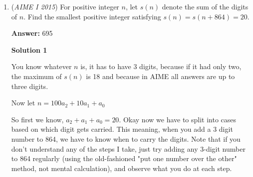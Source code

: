 \begin{enumerate}
 Since $AE$ = $AM + ME$, we get

 
 \[2 \cdot \frac{3\sqrt{11}}{\sqrt5} + \sqrt{5} \cdot \frac{\frac{4a\sqrt5}{7} - \frac{9\sqrt{11}}{2}}{2} = a\]

 \[\Rightarrow 12\sqrt{11} + 5(\frac{4a\sqrt5}{7} - \frac{9\sqrt{11}}{2}) = 2\sqrt5a\]

 \[\Rightarrow \frac{-21}{2}\sqrt{11} + \frac{20a\sqrt5}{7} = 2\sqrt5a\]

 \[\Rightarrow -21\sqrt{11} = 2\sqrt5a\frac{14 - 20}{7}\]

 \[\Rightarrow \frac{49\sqrt{11}}{4} = \sqrt5a\]

 \[\Rightarrow 7\sqrt{11} = \frac{4a\sqrt{5}}{7}\]

 So our final answer is $(7\sqrt{11})^2 = \boxed{539}$.

 



\textbf{Solution 3}

This is the quickest solution. We see that with a ruler, $KL = \frac{3}{2}$ cm and $HG = \frac{7}{2}$ cm. Thus if $KL$ corresponds with an area of $99$, then $HG$ ($FGHJ$'s area) would correspond with $99*(\frac{7}{3})^2 = \boxed{539}$ - aops5234

 


	\item (\textit{AIME I 2015}) For positive integer $n$, let $s(n)$ denote the sum of the digits of $n$.  Find the smallest positive integer satisfying $s(n) = s(n+864) = 20$.


 



 
 \textbf{Answer: }695



\textbf{Solution 1}

You know whatever $n$ is, it has to have 3 digits, because if it had only two, the maximum of $s(n)$ is 18 and because in AIME all answers are up to three digits. 

 Now let $n=100a_2+10a_1+a_0$

 So first we know, $a_2+a_1+a_0=20$. Okay now we have to split into cases based on which digit gets carried. This meaning, when you add a 3 digit number to 864, we have to know when to carry the digits. Note that if you don't understand any of the steps I take, just try adding any 3-digit number to 864 regularly (using the old-fashioned "put one number over the other" method, not mental calculation), and observe what you do at each step.


\end{enumerate}
